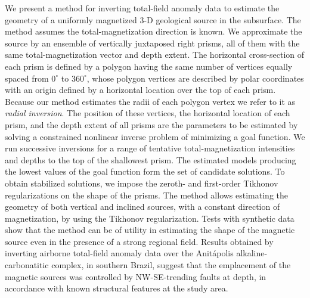 \begin{summary}
We present a method for inverting total-field anomaly data to estimate the geometry of 
a uniformly magnetized 3-D geological source in the subsurface. The method assumes 
the total-magnetization direction is known. 
We approximate the source by an ensemble of vertically juxtaposed right prisms, all of them with the same total-magnetization vector and depth extent. 
The horizontal cross-section of each prism is defined by a polygon having the same number of vertices equally spaced from $0^{\circ}$ to $360^{\circ}$,  whose polygon vertices 
are described by polar coordinates with an origin defined by a horizontal location 
over the top of each prism. 
Because our method estimates the radii of each polygon vertex  we refer to it as 
\textit{radial inversion}.
The position of these vertices, the horizontal location of each prism, and the depth extent of all prisms are the parameters to be estimated by solving a constrained nonlinear inverse problem of minimizing a goal function. 
We run successive inversions for a range of tentative total-magnetization intensities 
and depths to the top of the shallowest prism. The estimated models producing 
the lowest values of the goal function form the set of candidate solutions.
To obtain stabilized solutions, we impose the zeroth- and first-order Tikhonov 
regularizations on the shape of the prisms. The method allows estimating the geometry 
of both vertical and inclined sources, with a constant direction of magnetization, 
by using the Tikhonov regularization. 
Tests with synthetic data show that the method can be of utility in estimating the shape of the magnetic source even in the presence of a strong regional field.
Results obtained by inverting airborne total-field anomaly data over the 
Anit{\'a}polis alkaline-carbonatitic complex, in southern Brazil, 
suggest that the emplacement of the magnetic sources was controlled by NW-SE-trending 
faults at depth, in accordance with known structural features at the study area.
\end{summary}